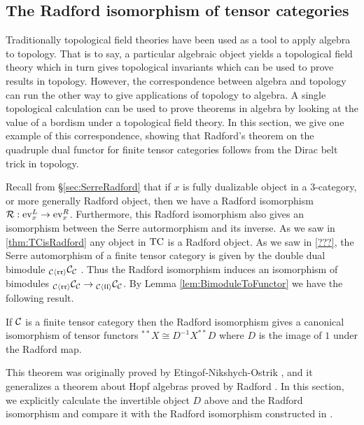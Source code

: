 \documentclass{amsart}
\begin{document}
\subsection{The Radford isomorphism of tensor categories} \label{sec:radiso}

Traditionally topological field theories have been used as a tool to apply algebra to topology.  That is to say, a particular algebraic object yields a topological field theory which in turn gives topological invariants which can be used to prove results in topology.  However, the correspondence between algebra and topology can run the other way to give applications of topology to algebra.  A single topological calculation can be used to prove theorems in algebra by looking at the value of a bordism under a topological field theory.  In this section, we give one example of this correspondence, showing that Radford's theorem on the quadruple dual functor for finite tensor categories follows from the Dirac belt trick in topology.

Recall from \S \ref{sec:SerreRadford} that if $x$ is fully dualizable object in a $3$-category, or more generally Radford object, then we have a Radford isomorphism $\mathcal R: \mathrm{ev}_x^L \rightarrow \mathrm{ev}_x^R$.  Furthermore, this Radford isomorphism also gives an isomorphism between the Serre autormorphism and its inverse.  As we saw in \ref{thm:TCisRadford} any object in $\mathrm{TC}$ is a Radford object.  As we saw in \ref{???}, the Serre automorphism of a finite tensor category is given by the double dual bimodule ${}_{\mathcal C \langle \mathfrak{r r} \rangle}\mathcal C_{\mathcal C}$ .  Thus the Radford isomorphism induces an isomorphism of bimodules ${}_{\mathcal C \langle \mathfrak{r r} \rangle} \mathcal C_{\mathcal C} \rightarrow {}_{\mathcal C \langle \mathfrak{l l} \rangle} \mathcal C_{\mathcal C}$.  By Lemma \ref{lem:BimoduleToFunctor} we have the following result.

\begin{theorem}
If $\mathcal C$ is a finite tensor category then the Radford isomorphism gives a canonical isomorphism of tensor functors ${}^{**}X \cong D^{-1} X^{**} D$ where $D$ is the image of $1$ under the Radford map.
\end{theorem}

This theorem was originally proved by Etingof-Nikshych-Ostrik \cite{MR2097289}, and it generalizes a theorem about Hopf algebras proved by Radford \cite{MR0407069}.  In this section, we explicitly calculate the invertible object $D$ above and the Radford isomorphism and compare it with the Radford isomorphism constructed in \cite{MR2097289}.
\end{document}
